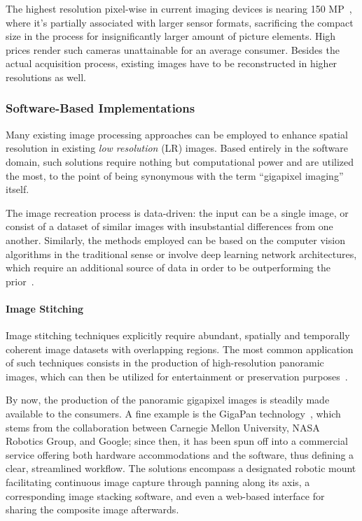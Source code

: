 The highest resolution pixel-wise in current imaging devices is nearing 150 MP~\cite{lawton_artaius_2021}, where it's partially associated with larger sensor formats, sacrificing the compact size in the process for insignificantly larger amount of picture elements. High prices render such cameras unattainable for an average consumer. Besides the actual acquisition process, existing images have to be reconstructed in higher resolutions as well.

\subsubsection{Software-Based Implementations}

Many existing image processing approaches can be employed to enhance spatial resolution in existing \textit{low resolution} (LR) images. Based entirely in the software domain, such solutions require nothing but computational power and are utilized the most, to the point of being synonymous with the term ``gigapixel imaging'' itself.

The image recreation process is data-driven: the input can be a single image, or consist of a dataset of similar images with insubstantial differences from one another. Similarly, the methods employed can be based on the computer vision algorithms in the traditional sense or involve deep learning network architectures, which require an additional source of data in order to be outperforming the prior~\cite{Anwar2020ADJ}.

\paragraph{Image Stitching}

Image stitching techniques explicitly require abundant, spatially and temporally coherent image datasets with overlapping regions. The most common application of such techniques consists in the production of high-resolution panoramic images, which can then be   utilized for entertainment or preservation purposes~\cite{7136690}.

By now, the production of the panoramic gigapixel images is steadily made available to the consumers. A fine example is the GigaPan technology~\cite{GigaPanWWW}, which stems from the collaboration between Carnegie Mellon University, NASA Robotics Group, and Google; since then, it has been spun off into a commercial service offering both hardware accommodations and the software, thus defining a clear, streamlined workflow. The solutions encompass a designated robotic mount facilitating continuous image capture through panning along its axis, a corresponding image stacking software, and even a web-based interface for sharing the composite image afterwards. 


